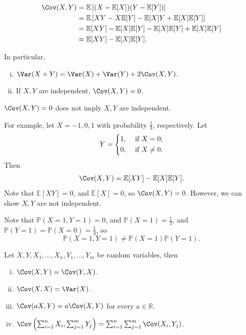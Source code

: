 \begin{observation}
    \begin{align*}
        \Cov(X, Y) &= \mathbb{E} \left[ (X - \mathbb{E}[X] ) (Y - \mathbb{E} [Y]) \right] \\
        &= \mathbb{E} \left[ XY - X \mathbb{E} [Y] - \mathbb{E} [X] Y + \mathbb{E} [X] \mathbb{E} [Y]  \right] \\
        &= \mathbb{E} [X Y] - \mathbb{E} [X] \mathbb{E} [Y] - \mathbb{E} [X] \mathbb{E} [Y] + \mathbb{E} [X] \mathbb{E} [Y] \\
        &= \mathbb{E} [XY] - \mathbb{E} [X] \mathbb{E} [Y].  
    \end{align*}

    In particular, 
    \begin{enumerate}[(i)]
        \item \(\Var(X + Y) = \Var(X) + \Var(Y) + 2 \Cov(X, Y)\). 
        \item If \(X, Y\) are independent, \(\Cov(X, Y) = 0\).   
    \end{enumerate}
\end{observation}

\begin{remark}
    \(\Cov(X, Y) = 0\) does not imply \(X, Y\) are independent.

    For example, let \(X = -1, 0, 1\) with probability \(\frac{1}{3}\), respectively. Let 
    \[
        Y = \begin{dcases}
            1, &\text{ if } X = 0;\\
            0, &\text{ if } X \neq 0.
        \end{dcases}
    \]    
    Then 
    \[
        \Cov(X, Y) = \mathbb{E} [X Y] - \mathbb{E} [X] \mathbb{E} [Y].
    \]
    Note that \(\mathbb{E} [X Y] = 0\), and \(\mathbb{E} [X] = 0\), so \(\Cov(X, Y) = 0\). However, we can show \(X, Y\) are not independent. 

    Note that \(\mathbb{P} (X = 1, Y = 1) = 0\), and \(\mathbb{P} (X = 1) = \frac{1}{3}\), and \(\mathbb{P} (Y = 1) = \mathbb{P} (X = 0) = \frac{1}{3}\), so 
    \[
        \mathbb{P} (X = 1, Y = 1) \neq \mathbb{P} (X = 1) \mathbb{P} (Y = 1). 
    \]      
\end{remark}

\begin{proposition}
    Let \(X, Y, X_1, \dots, X_n, Y_1, \dots, Y_m\) be random variables, then 
    \begin{enumerate}[(i)]
        \item \(\Cov(X, Y) = \Cov(Y, X)\). 
        \item \(\Cov(X, X) = \Var(X)\). 
        \item \(\Cov(aX, Y) = a \Cov(X, Y)\) for every \(a \in \mathbb{R}\). 
        \item \(\Cov \left( \sum_{i=1}^n X_i , \sum_{j=1}^m Y_j   \right) = \sum_{i=1}^n \sum_{j=1}^m \Cov(X_i, Y_j)   \).      
    \end{enumerate} 
\end{proposition}

